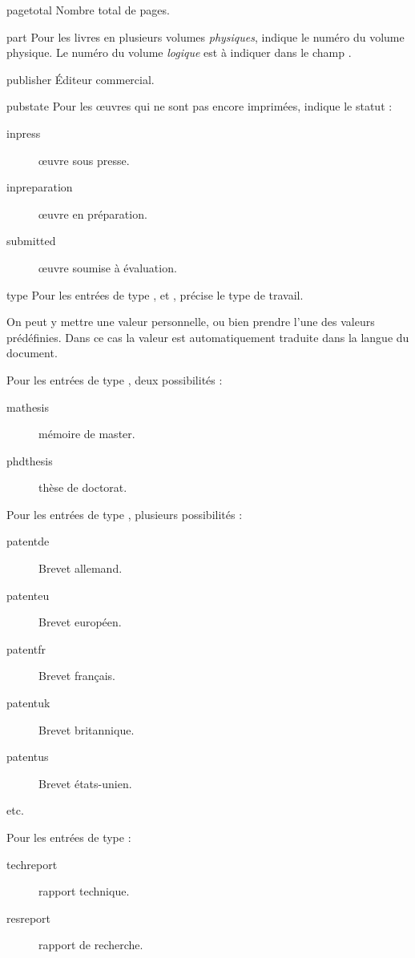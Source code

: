 \begin{choix}
	\item[pagetotal] Nombre total de pages.
   	\item[part] Pour les livres en plusieurs volumes \emph{physiques}, indique le numéro du volume physique.  Le numéro du volume \emph{logique} est à indiquer dans le champ .
   	\item[publisher] Éditeur commercial.					
   	\item[pubstate] Pour les œuvres qui ne sont pas encore imprimées, indique le statut :
					\begin{description}
						\item[inpress]œuvre sous presse.
						\item[inpreparation]œuvre en préparation.
						\item[submitted]œuvre soumise à évaluation.
					\end{description}
					
					
   	\item[type] Pour les entrées de type  ,  et , précise le type de travail.
	
	On peut y mettre une valeur personnelle, ou bien prendre l'une des valeurs prédéfinies. Dans ce cas la valeur est automatiquement traduite dans la langue du document.
	
	 Pour les entrées de type , deux possibilités :
					\begin{description}
						\item[mathesis]mémoire de master.
						\item[phdthesis]thèse de doctorat.
					\end{description}
					
					 Pour les entrées de type , plusieurs  possibilités : 
					 
					 
					 \begin{description}
						\item[patentde] Brevet allemand.
						\item[patenteu] Brevet européen.
						\item[patentfr] Brevet français.
						\item[patentuk] Brevet britannique.
						\item[patentus] Brevet états-unien.
						\item[etc.]
					 \end{description}
					
					Pour les entrées de type  : \nopagebreak
					\begin{description}
						\item[techreport]rapport technique.
						\item[resreport]rapport de recherche.
					\end{description}
					

\end{choix}
